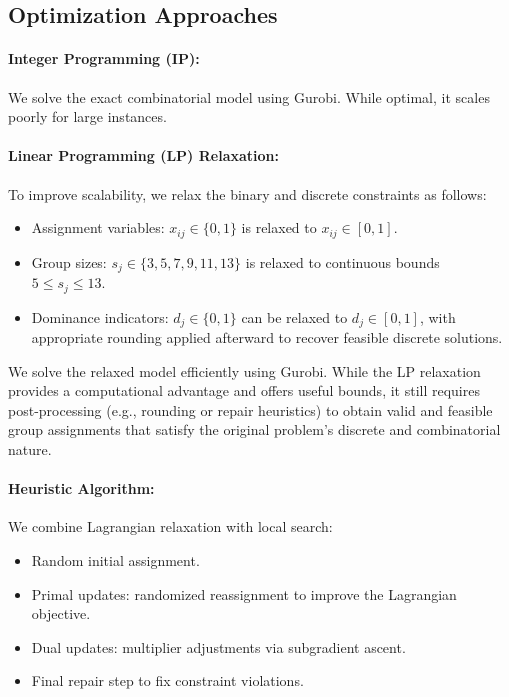 \subsection*{Optimization Approaches}

\paragraph{Integer Programming (IP):}
We solve the exact combinatorial model using Gurobi. While optimal, it scales poorly for large instances.

\paragraph{Linear Programming (LP) Relaxation:}
To improve scalability, we relax the binary and discrete constraints as follows:  
\begin{itemize}  
    \item Assignment variables: \( x_{ij} \in \{0, 1\} \) is relaxed to \( x_{ij} \in [0, 1] \).  
    \item Group sizes: \( s_j \in \{3, 5, 7, 9, 11, 13\} \) is relaxed to continuous bounds \( 5 \leq s_j \leq 13 \).  
    \item Dominance indicators: \( d_j \in \{0, 1\} \) can be relaxed to \( d_j \in [0, 1] \), with appropriate rounding applied afterward to recover feasible discrete solutions.  
\end{itemize}  
We solve the relaxed model efficiently using Gurobi. While the LP relaxation provides a computational advantage and offers useful bounds, it still requires post-processing (e.g., rounding or repair heuristics) to obtain valid and feasible group assignments that satisfy the original problem’s discrete and combinatorial nature.

\paragraph{Heuristic Algorithm:}
We combine Lagrangian relaxation with local search:
\begin{itemize}
    \item Random initial assignment.
    \item Primal updates: randomized reassignment to improve the Lagrangian objective.
    \item Dual updates: multiplier adjustments via subgradient ascent.
    \item Final repair step to fix constraint violations.
\end{itemize}

